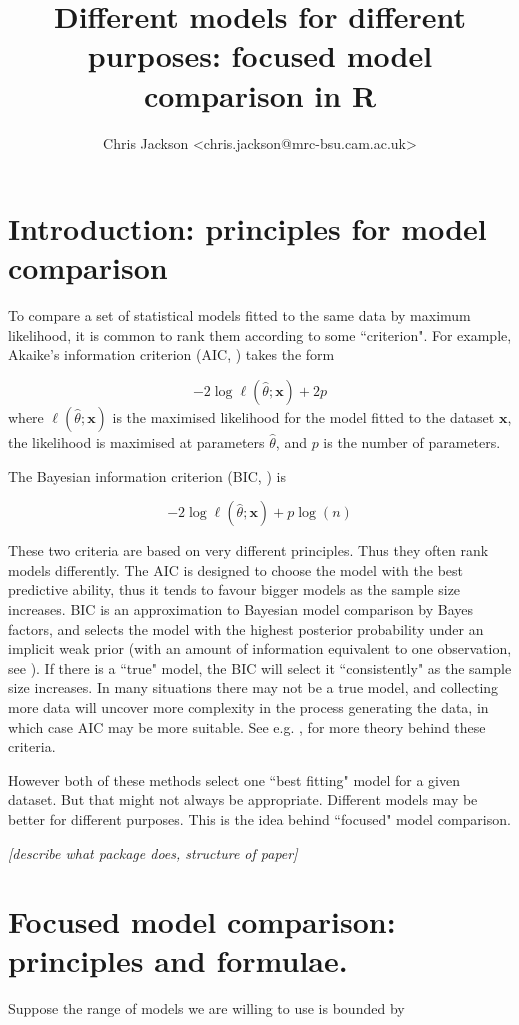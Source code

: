 \documentclass[article,shortnames,nojss,nofooter]{jss}\usepackage[]{graphicx}\usepackage[]{color}
\title{Different models for different purposes: focused model comparison in R}
\author{Chris Jackson <chris.jackson@mrc-bsu.cam.ac.uk>}
\begin{document}
\section{Introduction: principles for model comparison}

To compare a set of statistical models fitted to the same data by maximum likelihood, it is common to rank them according to some ``criterion".  For example, Akaike's information criterion (AIC, \citet{aic}) takes the form 

$$ -2\log \ell(\hat\theta ; \mathbf{x}) + 2p $$
where $\ell(\hat\theta ; \mathbf{x})$ is the maximised likelihood for the model fitted to the dataset $\mathbf{x}$, the likelihood is maximised at parameters $\hat\theta$, and $p$ is the number of parameters. 

The Bayesian information criterion (BIC, \citet{schwarz}) is

$$ -2\log \ell(\hat\theta ; \mathbf{x}) + p\log(n) $$

These two criteria are based on very different principles.  Thus they often rank models differently.  The AIC is designed to choose the model with the best predictive ability, thus it tends to favour bigger models as the sample size increases.  BIC is an approximation to Bayesian model comparison by Bayes factors, and selects the model with the highest posterior probability under an implicit weak prior (with an amount of information equivalent to one observation, see \citet{kass:wasserman} ).  If there is a ``true" model, the BIC will select it ``consistently" as the sample size increases.  In many situations there may not be a true model, and collecting more data will uncover more complexity in the process generating the data, in which case AIC may be more suitable.   See e.g. \citet{burnham:anderson:book}, \citet{claeskens:hjort:book} for more theory behind these criteria.

However both of these methods select one ``best fitting" model for a given dataset.  But that might not always be appropriate. Different models may be better for different purposes.  This is the idea behind ``focused" model comparison.   

\emph{[describe what package does, structure of paper]}


\section{Focused model comparison: principles and formulae.}

Suppose the range of models we are willing to use is bounded by 
\end{document}
